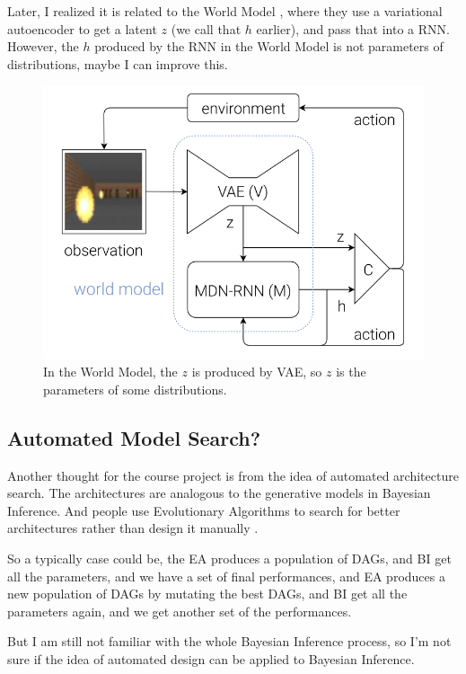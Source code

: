 Later,
I realized it is related to the World Model  \cite{ha_world_2018},
where they use a variational autoencoder to get a latent $z$ (we call that $h$ earlier), and pass that into a RNN.
However, the $h$ produced by the RNN in the World Model is not parameters of distributions, maybe I can improve this.

\begin{figure}[h]
    \centering
    \includegraphics[width=.5\textwidth]{./world_model.png}
    \caption{In the World Model, the $z$ is produced by VAE, so $z$ is the parameters of some distributions.}
\end{figure}



\subsection{Automated Model Search?}

Another thought for the course project is from the idea of automated architecture search.
The architectures are analogous to the generative models in Bayesian Inference.
And people use Evolutionary Algorithms to search for better architectures rather than design it manually \cite{real_regularized_2019}.

So a typically case could be, the EA produces a population of DAGs, 
and BI get all the parameters, and we have a set of final performances,
and EA produces a new population of DAGs by mutating the best DAGs,
and BI get all the parameters again, and we get another set of the performances.

But I am still not familiar with the whole Bayesian Inference process, so I'm not sure if the idea of automated design can be applied to Bayesian Inference.






